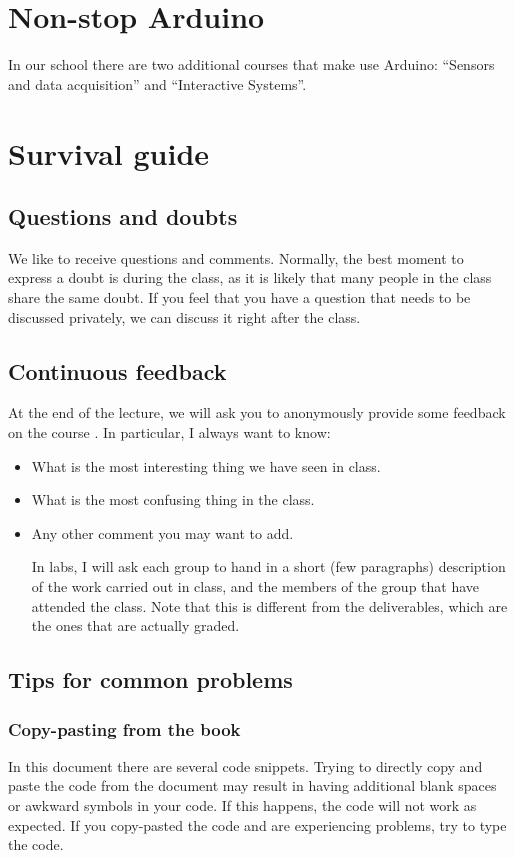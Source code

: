 \section{Non-stop Arduino}
In our school there are two additional courses that make use Arduino: ``Sensors and data acquisition'' and ``Interactive Systems''.

\section{Survival guide}

\subsection{Questions and doubts}
We like to receive questions and comments.
Normally, the best moment to express a doubt is during the class, as it is likely that many people in the class share the same doubt.
If you feel that you have a question that needs to be discussed privately, we can discuss it right after the class.

\subsection{Continuous feedback}
At the end of the lecture, we will ask you to anonymously provide some feedback on the course \emph{}.
In particular, I always want to know:
\begin{itemize}
\item What is the most interesting thing we have seen in class.
\item What is the most confusing thing in the class.
\item Any other comment you may want to add.

In labs, I will ask each group to hand in a short (few paragraphs) description of the work carried out in class, and the members of the group that have attended the class.
Note that this is different from the deliverables, which are the ones that are actually graded.
\end{itemize}

\subsection{Tips for common problems}

\subsubsection{Copy-pasting from the book}
In this document there are several code snippets. 
Trying to directly copy and paste the code from the document may result in having additional blank spaces or awkward symbols in your code.
If this happens, the code will not work as expected.
If you copy-pasted the code and are experiencing problems, try to type the code.

